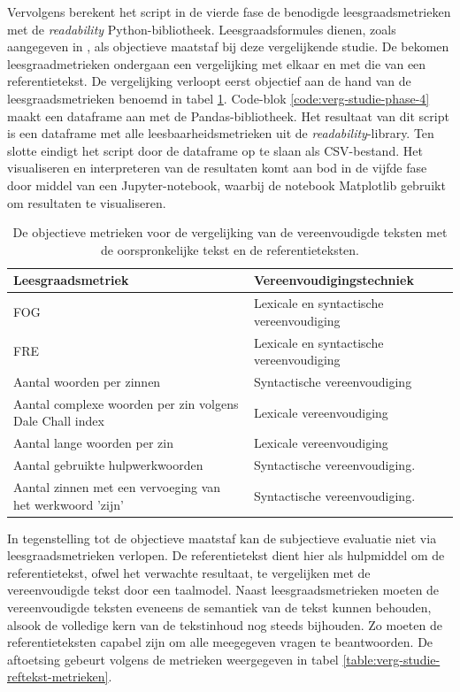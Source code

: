 % 
Vervolgens berekent het script in de vierde fase de benodigde leesgraadsmetrieken met de \textit{readability} Python-bibliotheek. Leesgraadsformules dienen, zoals aangegeven in \textcite{Nenkova2004}, als objectieve maatstaf bij deze vergelijkende studie. De bekomen leesgraadmetrieken ondergaan een vergelijking met elkaar en met die van een referentietekst. De vergelijking verloopt eerst objectief aan de hand van de leesgraadsmetrieken benoemd in tabel \ref{table:verg-studie-metrieken}. Code-blok \ref{code:verg-studie-phase-4} maakt een dataframe aan met de Pandas-bibliotheek. Het resultaat van dit script is een dataframe met alle leesbaarheidsmetrieken uit de \textit{readability}-library. Ten slotte eindigt het script door de dataframe op te slaan als CSV-bestand. Het visualiseren en interpreteren van de resultaten komt aan bod in de vijfde fase door middel van een Jupyter-notebook, waarbij de notebook Matplotlib gebruikt om resultaten te visualiseren.

\begin{center}
	\begin{table}[H]
		\begin{tabular}{ | m{8cm} | m{7cm} | } 
			\hline
			\textbf{Leesgraadsmetriek} & \textbf{Vereenvoudigingstechniek }\\
			\hline
			FOG & Lexicale en syntactische vereenvoudiging \\
			\hline
			FRE & Lexicale en syntactische vereenvoudiging \\
			\hline
			Aantal woorden per zinnen & Syntactische vereenvoudiging \\
			\hline
			Aantal complexe woorden per zin volgens Dale Chall index & Lexicale vereenvoudiging \\
			\hline
			Aantal lange woorden per zin & Lexicale vereenvoudiging \\
			\hline
			Aantal gebruikte hulpwerkwoorden & Syntactische vereenvoudiging. \\
			\hline
			Aantal zinnen met een vervoeging van het werkwoord 'zijn' & Syntactische vereenvoudiging. \\
			\hline
		\end{tabular}
		\caption{De objectieve metrieken voor de vergelijking van de vereenvoudigde teksten met de oorspronkelijke tekst en de referentieteksten.}
		\label{table:verg-studie-metrieken}
	\end{table}
\end{center}

%
In tegenstelling tot de objectieve maatstaf kan de subjectieve evaluatie niet via leesgraadsmetrieken verlopen. De referentietekst dient hier als hulpmiddel om de referentietekst, ofwel het verwachte resultaat, te vergelijken met de vereenvoudigde tekst door een taalmodel. Naast leesgraadsmetrieken moeten de vereenvoudigde teksten eveneens de semantiek van de tekst kunnen behouden, alsook de volledige kern van de tekstinhoud nog steeds bijhouden. Zo moeten de referentieteksten capabel zijn om alle meegegeven vragen te beantwoorden. De aftoetsing gebeurt volgens de metrieken weergegeven in tabel \ref{table:verg-studie-reftekst-metrieken}.

